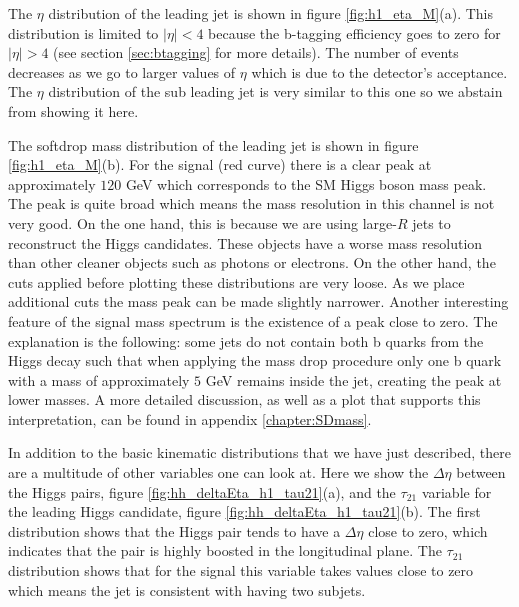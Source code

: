 The $\eta$ distribution of the leading jet is shown in figure \ref{fig:h1_eta_M}(a). This distribution is limited to $|\eta|<4$ because the b-tagging efficiency goes to zero for $|\eta|>4$ (see section \ref{sec:btagging} for more details). The number of events decreases as we go to larger values of $\eta$ which is due to the detector's acceptance. The $\eta$ distribution of the sub leading jet is very similar to this one so we abstain from showing it here.

The softdrop mass distribution of the leading jet is shown in figure \ref{fig:h1_eta_M}(b). For the signal (red curve) there is a clear peak at approximately $120$ GeV which corresponds to the SM Higgs boson mass peak. The peak is quite broad which means the mass resolution in this channel is not very good. On the one hand, this is because we are using large-$R$ jets to reconstruct the Higgs candidates. These objects have a worse mass resolution than other cleaner objects such as photons or electrons.  On the other hand, the cuts applied before plotting these distributions are very loose. As we place additional cuts the mass peak can be made slightly narrower. Another interesting feature of the signal mass spectrum is the existence of a peak close to zero. The explanation is the following: some jets do not contain both b quarks from the Higgs decay such that when applying the mass drop procedure only one b quark with a mass of approximately $5$ GeV remains inside the jet, creating the peak at lower masses. A more detailed discussion, as well as a plot that supports this interpretation, can be found in appendix \ref{chapter:SDmass}.

In addition to the basic kinematic distributions that we have just described, there are a multitude of other variables one can look at. Here we show the $\Delta\eta$ between the Higgs pairs, figure \ref{fig:hh_deltaEta_h1_tau21}(a), and the $\tau_{21}$ variable for the leading Higgs candidate, figure \ref{fig:hh_deltaEta_h1_tau21}(b). The first distribution shows that the Higgs pair tends to have a $\Delta\eta$ close to zero, which indicates that the pair is highly boosted in the longitudinal plane. The $\tau_{21}$ distribution shows that for the signal this variable takes values close to zero which means the jet is consistent with having two subjets.

